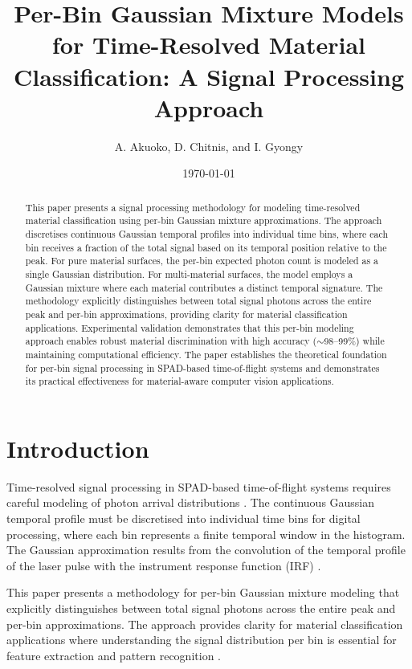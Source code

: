 \documentclass[10pt,twocolumn]{article}
\title{Per-Bin Gaussian Mixture Models for Time-Resolved Material Classification: A Signal Processing Approach}
\author{A. Akuoko, D. Chitnis, and I. Gyongy}
\date{\today}
\begin{document}
\maketitle

\begin{abstract}
This paper presents a signal processing methodology for modeling time-resolved material classification using per-bin Gaussian mixture approximations. The approach discretises continuous Gaussian temporal profiles into individual time bins, where each bin receives a fraction of the total signal based on its temporal position relative to the peak. For pure material surfaces, the per-bin expected photon count is modeled as a single Gaussian distribution. For multi-material surfaces, the model employs a Gaussian mixture where each material contributes a distinct temporal signature. The methodology explicitly distinguishes between total signal photons across the entire peak and per-bin approximations, providing clarity for material classification applications. Experimental validation demonstrates that this per-bin modeling approach enables robust material discrimination with high accuracy ($\sim$98--99\%) while maintaining computational efficiency. The paper establishes the theoretical foundation for per-bin signal processing in SPAD-based time-of-flight systems and demonstrates its practical effectiveness for material-aware computer vision applications.
\end{abstract}

\section{Introduction}

Time-resolved signal processing in SPAD-based time-of-flight systems requires careful modeling of photon arrival distributions \cite{piron2020,tontini2020}. The continuous Gaussian temporal profile must be discretised into individual time bins for digital processing, where each bin represents a finite temporal window in the histogram. The Gaussian approximation results from the convolution of the temporal profile of the laser pulse with the instrument response function (IRF) \cite{tontini2020,koerner2021}.

This paper presents a methodology for per-bin Gaussian mixture modeling that explicitly distinguishes between total signal photons across the entire peak and per-bin approximations. The approach provides clarity for material classification applications where understanding the signal distribution per bin is essential for feature extraction and pattern recognition \cite{su2016,becker2023}.
\end{document}
